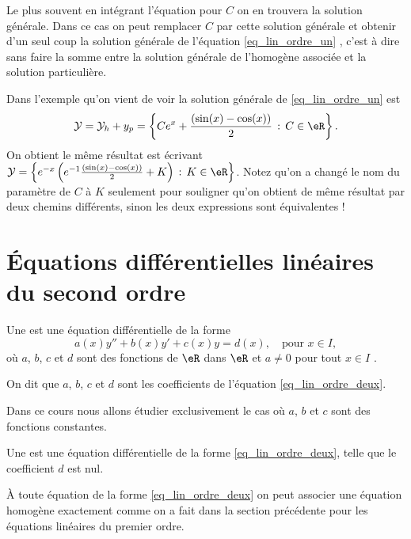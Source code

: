 \begin{remark}
  Le plus souvent en intégrant l'équation pour $C$ on en trouvera la solution générale. Dans ce cas on peut remplacer $C$ par cette solution générale et obtenir d'un seul coup la solution générale de l'équation \eqref{eq_lin_ordre_un} , c'est à dire sans faire la somme entre la solution générale de l'homogène associée et la solution particulière.

  \begin{example}
    Dans l'exemple qu'on vient de voir la solution générale de \eqref{eq_lin_ordre_un} est
    \begin{equation}
      \mathcal{Y} = \mathcal{Y}_h + y_p = \left\{Ce^x + \frac{(\sin(x)-\cos(x))}{2} \,:\, C\in\eR\right\}.
    \end{equation}
On obtient le m\^eme résultat est écrivant $\mathcal{Y} = \left\{e^{-x}\left(e^{-1}\frac{(\sin(x)-\cos(x))}{2} +K \right) \,:\, K\in\eR\right\}$. Notez qu'on a changé le nom du paramètre de $C$ à $K$ seulement pour souligner qu'on obtient de m\^eme résultat par deux chemins différents, sinon les deux expressions sont équivalentes !
  \end{example}
\end{remark}

\section{Équations différentielles linéaires du second ordre}
\label{Secordredeux}

\begin{definition}
Une   est une équation différentielle de la forme
\begin{equation}\label{eq_lin_ordre_deux}
  a(x)y'' + b(x) y' + c(x)y = d(x), \quad\text{pour } x\in I,
\end{equation}
o\`u $a$, $b$, $c$ et $d$ sont des fonctions de $\eR$ dans $\eR$ et $a\neq 0$ pour tout $x\in I$ .

On dit que $a$, $b$, $c$ et $d$ sont les coefficients de l'équation \eqref{eq_lin_ordre_deux}.
\end{definition}
Dans ce cours nous allons étudier exclusivement le cas où $a$, $b$ et $c$ sont des fonctions constantes.
\begin{definition}
Une   est une équation différentielle de la forme \eqref{eq_lin_ordre_deux}, telle que le coefficient $d$ est nul.
\end{definition}
À toute équation de la forme \eqref{eq_lin_ordre_deux} on peut associer une équation homogène exactement comme on a fait dans la section précédente pour les équations linéaires du premier ordre.


